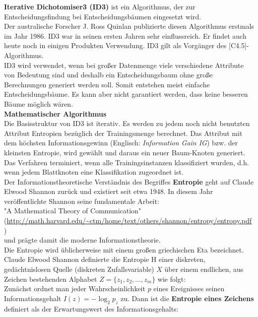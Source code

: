 \documentclass[12pt]{article}
\begin{document}
\textbf{Iterative Dichotomiser3 (ID3)} ist ein Algorithmus, der zur Entscheidungsfindung bei Entscheidungsbäumen eingesetzt wird.\\
Der australische Forscher J. Ross Quinlan publizierte diesen Algorithmus erstmals im Jahr 1986. ID3 war in seinen ersten Jahren sehr einflussreich. Er findet auch heute noch in einigen Produkten Verwendung. ID3 gilt als Vorgänger des [C4.5]-Algorithmus.\\
%
ID3 wird verwendet, wenn bei großer Datenmenge viele verschiedene Attribute von Bedeutung sind und deshalb ein Entscheidungsbaum ohne große Berechnungen generiert werden soll. Somit entstehen meist einfache Entscheidungsbäume. Es kann aber nicht garantiert werden, dass keine besseren Bäume möglich wären.\\[0.2cm]
%
\textbf{Mathematischer Algorithmus} \\[0.2cm]
Die Basisstruktur von ID3 ist iterativ. Es werden zu jedem noch nicht benutzten Attribut Entropien bezüglich der Trainingsmenge berechnet. Das Attribut mit dem höchsten Informationsgewinn (Englisch: \textit{Information Gain IG}) bzw. der kleinsten Entropie, wird gewählt und daraus ein neuer Baum-Knoten generiert.\\[0.1cm]
Das Verfahren terminiert, wenn alle Trainingsinstanzen klassifiziert wurden, d.h. wenn jedem Blattknoten eine Klassifikation zugeordnet ist.\\[0.1cm]
Der Informationstheoretische Verständnis des Begriffes \textbf {Entropie} geht auf Claude Elwood Shannon zurück und existiert seit etwa 1948. In diesem Jahr veröffentlichte Shannon seine fundamentale Arbeit:\\
 "A Mathematical Theory of Communication" \\ (\url{http://math.harvard.edu/~ctm/home/text/others/shannon/entropy/entropy.pdf})\\
und prägte damit die moderne Informationstheorie.\\
Die Entropie wird üblicherweise mit einem großen griechischen Eta   bezeichnet. Claude Elwood Shannon definierte die Entropie $ \mathrm{H} $ einer diskreten, gedächtnislosen Quelle (diskreten Zufallsvariable) $ X $ über einem endlichen, aus Zeichen bestehenden Alphabet $ Z=\{z_1, z_2, \dots, z_m\}$ wie folgt:\\[0.2cm]
Zunächst ordnet man jeder Wahrscheinlichkeit $ p $ eines Ereignisses seinen Informationsgehalt $ I(z) = -\log_2 p_z $ zu. Dann ist die \textbf{Entropie eines Zeichens} definiert als der Erwartungswert des Informationsgehalts: \
\end{document}
